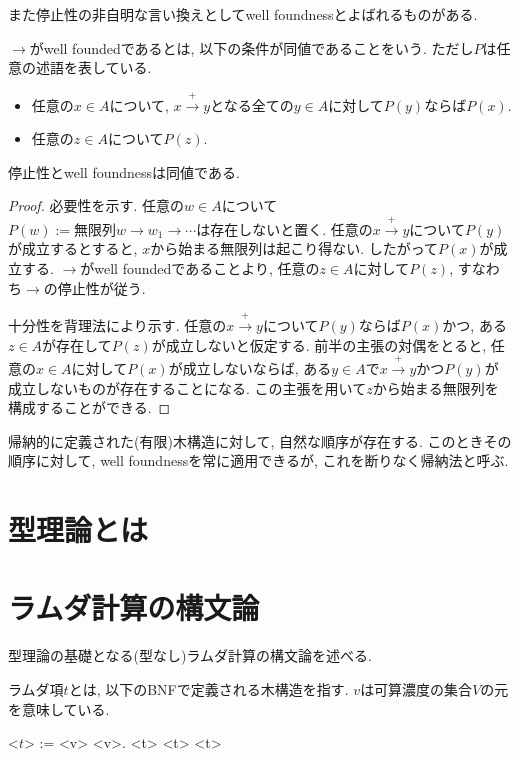 \documentclass{ltjsarticle}
\begin{document}
また停止性の非自明な言い換えとしてwell foundnessとよばれるものがある.

\begin{defn}
$\rightarrow$がwell foundedであるとは, 以下の条件が同値であることをいう. ただし$P$は任意の述語を表している.
 \begin{itemize}
  \item 任意の$x \in A$について, $x \xrightarrow{+} y$となる全ての$y \in A$に対して$P(y)$ならば$P(x)$.
  \item 任意の$z \in A$について$P(z)$.
 \end{itemize}
\end{defn}

\begin{thm}
 停止性とwell foundnessは同値である.
\end{thm}

\begin{proof}
 必要性を示す. 任意の$w \in A$について$P(w):= \text{無限列} w \rightarrow w_1 \rightarrow \cdots \text{は存在しない}$と置く. 任意の$x \xrightarrow{+} y$について$P(y)$が成立するとすると, $x$から始まる無限列は起こり得ない. したがって$P(x)$が成立する. $\rightarrow$がwell foundedであることより, 任意の$z \in A$に対して$P(z)$, すなわち$\rightarrow$の停止性が従う.
 
 十分性を背理法により示す. 任意の$x \xrightarrow{+} y$について$P(y)$ならば$P(x)$かつ, ある$z \in A$が存在して$P(z)$が成立しないと仮定する. 前半の主張の対偶をとると, 任意の$x \in A$に対して$P(x)$が成立しないならば, ある$y \in A$で$x \xrightarrow{+} y$かつ$P(y)$が成立しないものが存在することになる. この主張を用いて$z$から始まる無限列を構成することができる.
\end{proof}

\begin{rem}
帰納的に定義された(有限)木構造に対して, 自然な順序が存在する.
このときその順序に対して, well foundnessを常に適用できるが, これを断りなく帰納法と呼ぶ.
\end{rem}

\section{型理論とは}

\section{ラムダ計算の構文論}
型理論の基礎となる(型なし)ラムダ計算の構文論を述べる.

\begin{defn}
 ラムダ項$t$とは, 以下のBNFで定義される木構造を指す. $v$は可算濃度の集合$V$の元を意味している.
\begin{grammar}
 <$t$> := <v> \alt \lambda <v>. <t> \alt <t> <t>
\end{grammar}
\end{defn}
\end{document}
